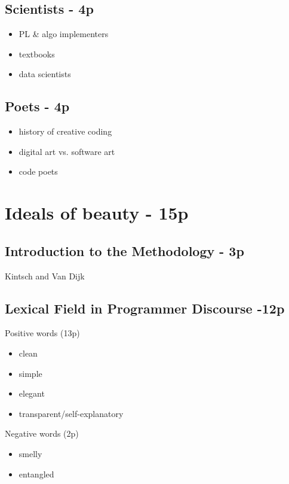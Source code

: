 \subsection{Scientists - 4p}

\begin{itemize}
    \item PL \& algo implementers
    \item textbooks
    \item data scientists
\end{itemize}

\subsection{Poets - 4p}

\begin{itemize}
    \item history of creative coding
    \item digital art vs. software art
    \item code poets
\end{itemize}


\section{Ideals of beauty - 15p}

\subsection{Introduction to the Methodology - 3p}

Kintsch and Van Dijk

\subsection{Lexical Field in Programmer Discourse -12p}

Positive words (13p)

\begin{itemize}
    \item clean
    \item simple
    \item elegant
    \item transparent/self-explanatory
\end{itemize}

Negative words (2p)

\begin{itemize}
    \item smelly
    \item entangled
\end{itemize}

